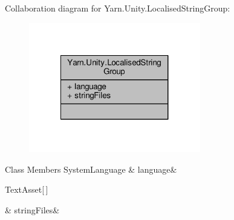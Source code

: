 Collaboration diagram for Yarn.\-Unity.\-Localised\-String\-Group\-:
\nopagebreak
\begin{figure}[H]
\begin{center}
\leavevmode
\includegraphics[width=212pt]{de/dc8/a00325}
\end{center}
\end{figure}
\begin{DoxyFields}{Class Members}
\hypertarget{a00109_a395d808fa32cb4fe68a62d7852534e1a}{System\-Language}\label{a00109_a395d808fa32cb4fe68a62d7852534e1a}
&
language&
\\
\hline

\hypertarget{a00109_a636624112fd57fedda96d485d20e6b9e}{Text\-Asset\mbox{[}$\,$\mbox{]}}\label{a00109_a636624112fd57fedda96d485d20e6b9e}
&
string\-Files&
\\
\hline

\end{DoxyFields}
